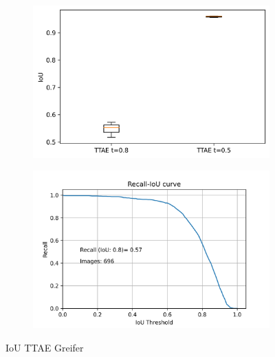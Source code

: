 	\begin{figure}[h]
 		\centering
 
 		\begin{subfigure}[c]{0.49\textwidth}			
 			\includegraphics[width=1\textwidth]{bilder/FazitUndAusblick/Grapple_TTAE_Res/IoU_TTAE_0805.png}
 		\end{subfigure}
 		\begin{subfigure}[c]{0.49\textwidth}			
 			\includegraphics[width=1\textwidth]{bilder/FazitUndAusblick/Grapple_TTAE_Res/Recall_IoU_TTAE.png}
 		\end{subfigure}
 		\caption{IoU TTAE Greifer}
 		\label{img:TTGrappleIoU}
 	\end{figure}
 
